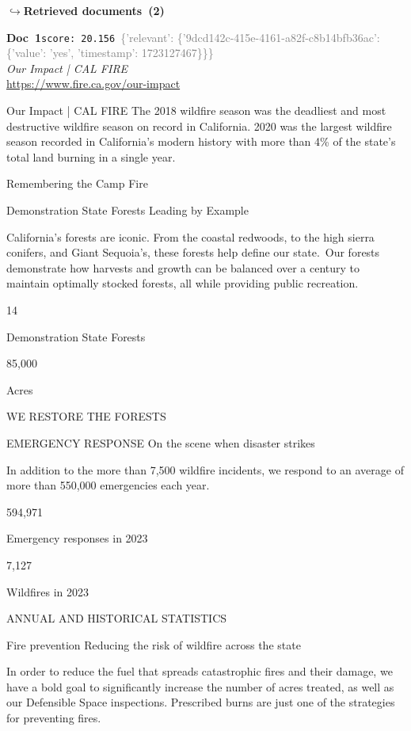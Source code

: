 \documentclass[a4paper,11pt]{article}
\begin{document}
\noindent\hfill{\footnotesize\textcolor{doccolor}{\textbf{$\hookrightarrow$\enspace Retrieved documents~(2)}}}
\begin{docenv}
{\footnotesize\textcolor{doccolor}{\textbf{Doc~1}}}\hfill{\tiny\texttt{score:~20.156}}\ {\tiny\textcolor{gray}{\{'relevant': \{'9dcd142c-415e-4161-a82f-c8b14bfb36ac': \{'value': 'yes', 'timestamp': 1723127467\}\}\}}}\\[3pt]
{\small\textit{Our Impact | CAL FIRE}}\\[2pt]
{\tiny\url{https://www.fire.ca.gov/our-impact}}\\[4pt]
{\footnotesize Our Impact | CAL FIRE
The 2018 wildfire season was the deadliest and most destructive wildfire season on record in California. 
2020 was the largest wildfire season recorded in California's modern history with more than 4\% of the state's total land burning in a single year. 

Remembering the Camp Fire

Demonstration State Forests
Leading by Example

California’s forests are iconic. From the coastal redwoods, to the high sierra conifers, and Giant Sequoia’s, these forests help define our state. Our forests demonstrate how harvests and growth can be balanced over a century to maintain optimally stocked forests, all while providing public recreation. 


 14
 
Demonstration State Forests


 85,000
 
Acres

WE RESTORE THE FORESTS

EMERGENCY RESPONSE
On the scene when disaster strikes

 In addition to the more than 7,500 wildfire incidents, we respond to an average of more than 550,000 emergencies each year. 
 


 594,971
 
Emergency responses in 2023


 7,127
 
Wildfires in 2023

ANNUAL AND HISTORICAL STATISTICS

Fire prevention
Reducing the risk of wildfire across the state

 In order to reduce the fuel that spreads catastrophic fires and their damage, we have a bold goal to significantly increase the number of acres treated, as well as our Defensible Space inspections. Prescribed burns are just one of the strategies for preventing fires. 
 
}
\end{docenv}
\end{document}
